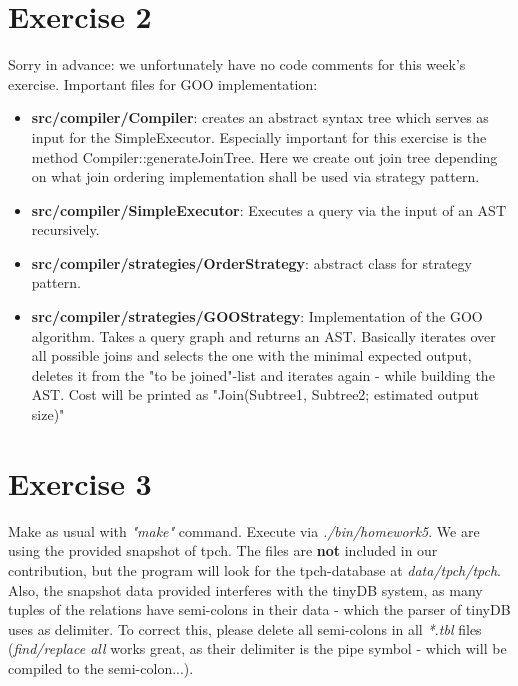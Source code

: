 \documentclass[paper=a4, fontsize=11pt]{scrartcl} %
\numberwithin{equation}{section} %
\numberwithin{figure}{section} %
\numberwithin{table}{section} %
\begin{document}
\section{Exercise 2}
Sorry in advance: we unfortunately have no code comments for this week's exercise. Important files for GOO implementation:
\begin{itemize}
	\item \textbf{src/compiler/Compiler}: creates an abstract syntax tree which serves as input for the SimpleExecutor. Especially important for this exercise is the method Compiler::generateJoinTree. Here we create out join tree depending on what join ordering implementation shall be used via strategy pattern. 
	\item \textbf{src/compiler/SimpleExecutor}: Executes a query via the input of an AST recursively.
	\item \textbf{src/compiler/strategies/OrderStrategy}: abstract class for strategy pattern.
	\item \textbf{src/compiler/strategies/GOOStrategy}: Implementation of the GOO algorithm. Takes a query graph and returns an AST. Basically iterates over all possible joins and selects the one with the minimal expected output, deletes it from the "to be joined"-list and iterates again - while building the AST.
	Cost will be printed as "Join(Subtree1, Subtree2; estimated output size)"
\end{itemize}


\section{Exercise 3}
Make as usual with \textit{"make"} command. Execute via \textit{./bin/homework5}. We are using the provided snapshot of tpch. The files are \textbf{not} included in our contribution, but the program will look for the tpch-database at \textit{data/tpch/tpch}. Also, the snapshot data provided interferes with the tinyDB system, as many tuples of the relations have semi-colons in their data - which the parser of tinyDB uses as delimiter. To correct this, please delete all semi-colons in all \textit{*.tbl} files (\textit{find/replace all} works great, as their delimiter is the pipe symbol - which will be compiled to the semi-colon...). 
\end{document}

